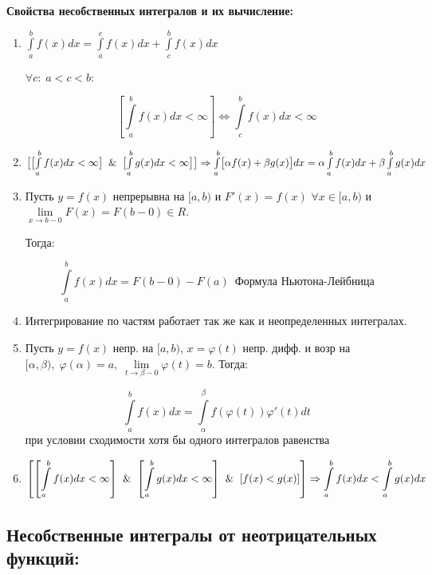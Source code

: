 \documentclass[a4paper,12pt]{article} %
\begin{document}
\textbf{Свойства несобственных интегралов и их вычисление:}

\begin{enumerate}
    \item $\int\limits_a^{b} f(x) dx = \int\limits_a^{c} f(x) dx + \int\limits_c^{b} f(x) dx$

$\forall c:\; a<c<b:$

$$\left[\int\limits_a^{b} f(x) dx<\infty \right] \Leftrightarrow \int\limits_c^{b} f(x) dx < \infty$$

    \item $\bigl[ \bigl[ \int\limits_a^{b} f(x) dx<\infty\bigr] \And \bigl[ \int\limits_a^{b} g(x) dx<\infty \bigr]\bigr] \Rightarrow \int\limits_a^{b} \bigl[\alpha f(x) + \beta g(x)\bigr] dx = \alpha \int\limits_a^{b} f(x) dx + \beta \int\limits_a^{b} g(x) dx$
    
    \item Пусть $y=f(x)$ непрерывна на $[a, b)$ и $F'(x) = f(x)$ $\forall x\in[a, b)$ и $\lim\limits_{x\rightarrow b-0} F(x) = F(b-0) \in R$.
    
    Тогда:
    
    $$\int\limits_a^{b} f(x) dx = F(b-0) - F(a)\; ~ \text{Формула Ньютона-Лейбница}$$ 
    
    
    \item  Интегрирование по частям работает так же как и неопределенных интегралах.
    
    \item Пусть $y=f(x)$ непр. на $[a, b)$, $x=\varphi(t)$ непр. дифф. и возр на $[\alpha, \beta),\; \varphi(\alpha)=a,\; 
    \lim\limits_{t\rightarrow \beta - 0}\varphi(t) = b$. Тогда:
    
    $$\int\limits_a^{b} f(x) dx = \int\limits_\alpha^{\beta} f(\varphi(t))\varphi ' (t) dt$$
    при условии сходимости хотя бы одного интегралов равенства
    
    \item $$\left[ \left[ \int\limits_a^{b} f(x) dx<\infty \right] \And \left[ \int\limits_a^{b} g(x) dx<\infty \right] \And \left[ f(x) < g(x) \right] \right] \Rightarrow \int\limits_a^{b} f(x) dx < \int\limits_a^{b} g(x) dx $$
    
\end{enumerate}

\subsection{Несобственные интегралы от неотрицательных функций:}
\end{document}
